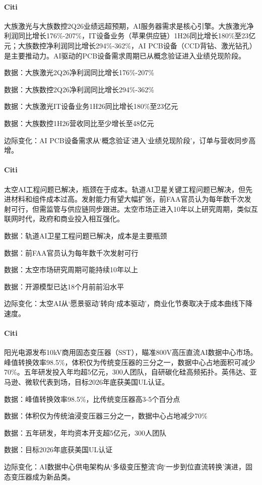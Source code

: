 \documentclass[11pt]{ctexart}
\begin{document}
\paragraph{Citi} 大族激光与大族数控2Q26业绩远超预期，AI服务器需求是核心引擎。大族激光净利润同比增长176\%-207\%，IT设备业务（苹果供应链）1H26同比增长180\%至23亿元；大族数控净利润同比增长294\%-362\%，AI PCB设备（CCD背钻、激光钻孔）是主要推动力。AI驱动的PCB设备需求周期已从概念验证进入业绩兑现阶段。
{\small\color{refgray}数据：大族激光2Q26净利润同比增长176\%-207\%\par}
{\small\color{refgray}数据：大族数控2Q26净利润同比增长294\%-362\%\par}
{\small\color{refgray}数据：大族激光IT设备业务1H26同比增长180\%至23亿元\par}
{\small\color{refgray}数据：大族数控1H26营收同比至少增长至48亿元\par}
{\small\color{refgray}边际变化：AI PCB设备需求从‘概念验证’进入‘业绩兑现阶段’，订单与营收同步高增。\par}
\paragraph{Citi} 太空AI工程问题已解决，瓶颈在于成本。轨道AI卫星关键工程问题已解决，但先进材料和组件成本过高。发射能力有望大幅扩张，前FAA官员认为每年数千次发射可行，但需监管与供应链同步跟进。太空市场正进入10年以上研究周期，类似互联网时代，政府和商业投入相互强化。
{\small\color{refgray}数据：轨道AI卫星工程问题已解决，成本是主要瓶颈\par}
{\small\color{refgray}数据：前FAA官员认为每年数千次发射可行\par}
{\small\color{refgray}数据：太空市场研究周期可能持续10年以上\par}
{\small\color{refgray}数据：开源模型已达18个月前前沿水平\par}
{\small\color{refgray}边际变化：太空AI从‘愿景驱动’转向‘成本驱动’，商业化节奏取决于成本曲线下降速度。\par}
\paragraph{Citi} 阳光电源发布10kV商用固态变压器（SST），瞄准800V高压直流AI数据中心市场。峰值转换效率98.5\%，体积仅为传统变压器的三分之一，数据中心占地面积可减少70\%。五年研发投入年均超5亿元，300人团队，自研碳化硅高频拓扑。英伟达、亚马逊、微软代表到场，目标2026年底获美国UL认证。
{\small\color{refgray}数据：峰值转换效率98.5\%，比传统变压器高3-5个百分点\par}
{\small\color{refgray}数据：体积仅为传统油浸变压器三分之一，数据中心占地减少70\%\par}
{\small\color{refgray}数据：五年研发，年均资本开支超5亿元，300人团队\par}
{\small\color{refgray}数据：目标2026年底获美国UL认证\par}
{\small\color{refgray}边际变化：AI数据中心供电架构从‘多级变压整流’向‘一步到位直流转换’演进，固态变压器成为新品类。\par}
\end{document}

